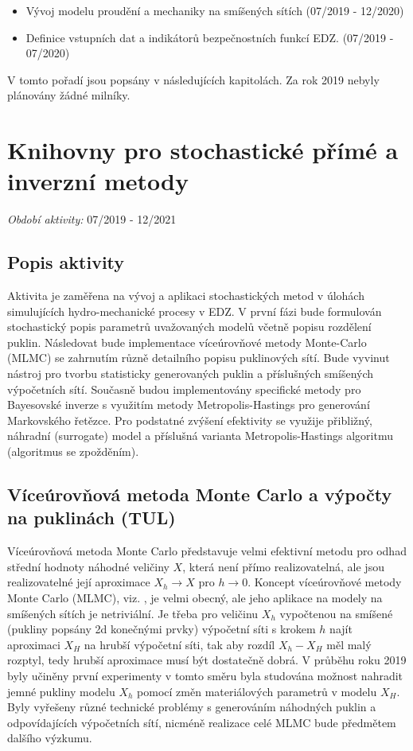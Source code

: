 \documentclass[11pt,a4paper]{article}
\begin{document}
\begin{onehalfspacing}
\begin{itemize}
\item Vývoj modelu proudění a mechaniky na smíšených sítích (07/2019 - 12/2020)

\item Definice vstupních dat a indikátorů bezpečnostních funkcí EDZ. (07/2019 - 07/2020)
\end{itemize}
V tomto pořadí jsou popsány v následujících kapitolách.
Za rok 2019 nebyly plánovány žádné milníky.





\section{Knihovny pro stochastické přímé a inverzní metody}
{\it Období aktivity:}  07/2019 - 12/2021

\subsection{Popis aktivity}
Aktivita je zaměřena na vývoj a aplikaci stochastických metod v úlohách simulujících hydro-mechanické procesy v EDZ. V první fázi
bude formulován stochastický popis parametrů uvažovaných modelů včetně popisu rozdělení puklin. Následovat bude implementace
víceúrovňové metody Monte-Carlo (MLMC) se zahrnutím různě detailního popisu puklinových sítí. Bude vyvinut nástroj pro tvorbu
statisticky generovaných puklin a příslušných smíšených výpočetních sítí. Současně budou implementovány specifické metody pro
Bayesovské inverze s využitím metody Metropolis-Hastings pro generování Markovského řetězce. Pro podstatné zvýšení efektivity se
využije přibližný, náhradní (surrogate) model a příslušná varianta Metropolis-Hastings algoritmu (algoritmus se zpožděním).

\subsection{Víceúrovňová metoda Monte Carlo a výpočty na puklinách (TUL)}
Víceúrovňová metoda Monte Carlo představuje velmi efektivní metodu pro odhad střední hodnoty náhodné veličiny $X$, která není přímo realizovatelná, ale jsou realizovatelné její aproximace $X_h \rightarrow X$ pro $h \rightarrow 0$. 
Koncept víceúrovňové metody Monte Carlo (MLMC), viz. \cite{Giles2015}, je velmi obecný, ale jeho aplikace na modely na smíšených sítích je netriviální. Je třeba pro veličinu $X_h$ vypočtenou na smíšené (pukliny popsány 2d konečnými prvky) výpočetní síti s krokem $h$ najít aproximaci $X_H$ na hrubší výpočetní síti, tak aby rozdíl $X_h - X_H$ měl malý rozptyl, tedy hrubší aproximace musí být dostatečně dobrá. V průběhu roku 2019 byly učiněny první experimenty v tomto směru byla studována možnost nahradit jemné pukliny modelu $X_h$ pomocí změn materiálových parametrů v modelu $X_H$. Byly vyřešeny různé technické problémy s generováním náhodných puklin a odpovídajících výpočetních sítí, nicméně realizace celé MLMC bude předmětem dalšího výzkumu.


\end{onehalfspacing}
\end{document}
